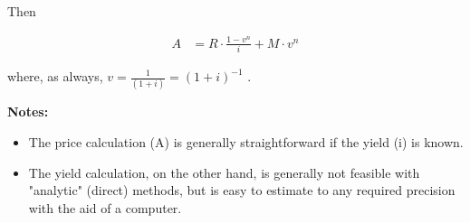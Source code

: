 \documentclass[14pt]{extarticle}
\begin{document}
Then


\begin{align*}
  A & = R \cdot \frac{1 - v^n}{i} + M \cdot v^n
\end{align*}


\begin{flushleft}
  where, as always, {\large $ v = \frac{1}{(1+i)} = (1+i)^{-1} $ }.
\end{flushleft}
\vspace{.2in}






\textbf{Notes:}

\begin{itemize}
  \item The price calculation (A) is generally straightforward if the yield (i) is known.
  \item The yield calculation, on the other hand, is generally not feasible with "analytic" (direct)
    methods, but is easy to estimate to any required precision with the aid of a computer.
\end{itemize}
\end{document}
